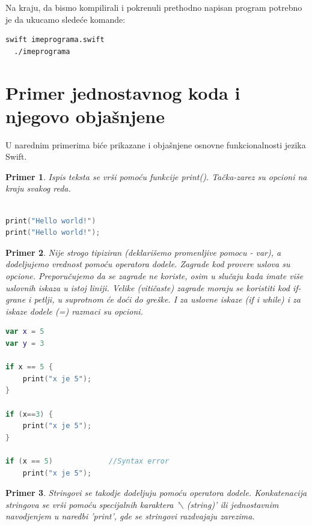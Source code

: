 \documentclass[a4paper]{article}
\newtheorem{primer}{Primer}[section]
\begin{document}
Na kraju, da bismo kompilirali i pokrenuli prethodno napisan program potrebno je da ukucamo sledeće komande:

\begin{lstlisting}[language=bash]
  swift imeprograma.swift
  ./imeprograma
\end{lstlisting}


\section{Primer jednostavnog koda i njegovo objašnjene}	
\label{sec:sestiDeo}

U narednim primerima biće prikazane i objašnjene osnovne funkcionalnosti jezika Swift.
\begin{primer}

Ispis teksta se vrši pomoću funkcije print(). Tačka-zarez su opcioni na kraju svakog reda.
\end{primer}

\begin{lstlisting}[language=Swift, caption={Ispis teksta},frame=single, label=simple]

print("Hello world!")
print("Hello world!");

\end{lstlisting}

\begin{primer}
Nije strogo tipiziran (deklarišemo promenljive pomocu - var), a dodeljujemo vrednost pomoću operatora dodele. Zagrade kod provere uslova su opcione. Preporučujemo da se zagrade ne koriste, osim u slučaju kada imate više uslovnih iskaza u istoj liniji.
Velike (vitičaste) zagrade moraju se koristiti kod if-grane i petlji, u suprotnom će doći do greške. I za uslovne iskaze (if i while) i za iskaze dodele (=) razmaci su opcioni.
\end{primer}
\begin{lstlisting}[language=Swift, caption={Dodeljivanje vrednosti i provera uslova},frame=single, label=simple]
var x = 5
var y = 3

if x == 5 {
	print("x je 5");
}

if (x==3) {
	print("x je 5");
}

if (x == 5)				//Syntax error
	print("x je 5");
\end{lstlisting}

\begin{primer}
Stringovi se takodje dodeljuju pomoću operatora dodele. Konkatenacija stringova se vrši pomoću specijalnih karaktera '$\backslash$ (string)' ili jednostavnim navodjenjem u naredbi 'print', gde se stringovi razdvajaju zarezima.
\end{primer}
\end{document}
